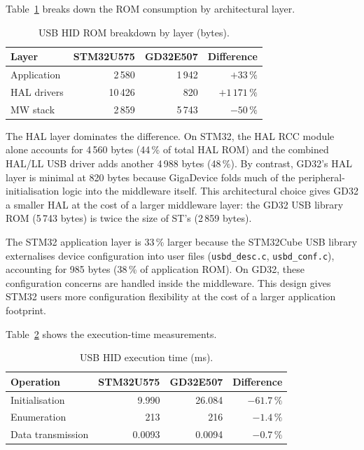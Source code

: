 Table~\ref{tab:gd32-usb-hid-rom} breaks down the ROM consumption by architectural layer.

\begin{table}[H]
  \centering
  \caption{USB HID ROM breakdown by layer (bytes).}
  \label{tab:gd32-usb-hid-rom}
  \begin{tabular}{l r r r}
    \toprule
    \textbf{Layer} & \textbf{STM32U575} & \textbf{GD32E507} & \textbf{Difference} \\
    \midrule
    Application    & 2\,580  & 1\,942 & $+33\,\%$ \\
    HAL drivers    & 10\,426 & 820    & $+1\,171\,\%$ \\
    MW stack       & 2\,859  & 5\,743 & $-50\,\%$ \\
    \bottomrule
  \end{tabular}
\end{table}

The HAL layer dominates the difference. On STM32, the HAL RCC module alone accounts for
4\,560 bytes (44\,\% of total HAL ROM) and the combined HAL/LL USB driver adds another
4\,988 bytes (48\,\%). By contrast, GD32's HAL layer is minimal at 820 bytes because
GigaDevice folds much of the peripheral-initialisation logic into the middleware itself.
This architectural choice gives GD32 a smaller HAL at the cost of a larger middleware
layer: the GD32 USB library ROM (5\,743 bytes) is twice the size of ST's (2\,859 bytes).

The STM32 application layer is 33\,\% larger because the STM32Cube USB library externalises
device configuration into user files (\texttt{usbd\_desc.c}, \texttt{usbd\_conf.c}),
accounting for 985 bytes (38\,\% of application ROM). On GD32, these configuration concerns
are handled inside the middleware. This design gives STM32 users more configuration
flexibility at the cost of a larger application footprint.

Table~\ref{tab:gd32-usb-hid-exec} shows the execution-time measurements.

\begin{table}[H]
  \centering
  \caption{USB HID execution time (ms).}
  \label{tab:gd32-usb-hid-exec}
  \begin{tabular}{l r r r}
    \toprule
    \textbf{Operation} & \textbf{STM32U575} & \textbf{GD32E507} & \textbf{Difference} \\
    \midrule
    Initialisation      & 9.990  & 26.084 & $-61.7\,\%$ \\
    Enumeration         & 213    & 216    & $-1.4\,\%$ \\
    Data transmission   & 0.0093 & 0.0094 & $-0.7\,\%$ \\
    \bottomrule
  \end{tabular}
\end{table}

